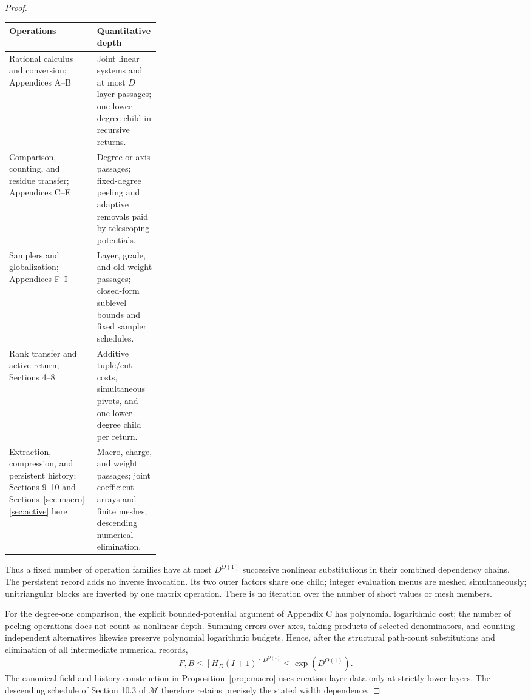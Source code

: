 \documentclass[11pt,a4paper]{article}
\theoremstyle{definition}
\newcommand{\M}{\mathcal M}
\begin{document}
\begin{proof}
\begin{center}
\small
\renewcommand{\arraystretch}{1.14}
\begin{tabularx}{\linewidth}{@{}>{\raggedright\arraybackslash}p{0.29\linewidth}X@{}}
\toprule
Operations & Quantitative depth \\ \midrule
Rational calculus and conversion; Appendices A--B
 & Joint linear systems and at most \(D\) layer passages;
   one lower-degree child in recursive returns.\\
Comparison, counting, and residue transfer; Appendices C--E
 & Degree or axis passages; fixed-degree peeling and
   adaptive removals paid by telescoping potentials.\\
Samplers and globalization; Appendices F--I
 & Layer, grade, and old-weight passages; closed-form
   sublevel bounds and fixed sampler schedules.\\
Rank transfer and active return; Sections 4--8
 & Additive tuple/cut costs, simultaneous pivots, and
   one lower-degree child per return.\\
Extraction, compression, and persistent history;
Sections 9--10 and Sections~\ref{sec:macro}--\ref{sec:active} here
 & Macro, charge, and weight passages; joint coefficient
   arrays and finite meshes; descending numerical elimination.\\
\bottomrule
\end{tabularx}
\end{center}

Thus a fixed number of operation families have at most
\(D^{O(1)}\) successive nonlinear substitutions in
their combined dependency chains. The persistent
record adds no inverse invocation. Its two outer
factors share one child; integer evaluation menus
are meshed simultaneously; unitriangular blocks
are inverted by one matrix operation. There is
no iteration over the number of short values or
mesh members.

For the degree-one comparison, the explicit
bounded-potential argument of Appendix C has
polynomial logarithmic cost; the number of
peeling operations does not count as nonlinear
depth. Summing errors over axes, taking products
of selected denominators, and counting independent
alternatives likewise preserve polynomial
logarithmic budgets. Hence, after the structural
path-count substitutions and elimination of all
intermediate numerical records,
\[
 F,B\le[H_D(I+1)]^{D^{O(1)}}
      \le\exp(D^{O(1)}).
\]
The canonical-field and history construction in
Proposition~\ref{prop:macro} uses creation-layer
data only at strictly lower layers. The descending
schedule of Section 10.3 of \(\M\) therefore
retains precisely the stated width dependence.
\end{proof}
\end{document}
